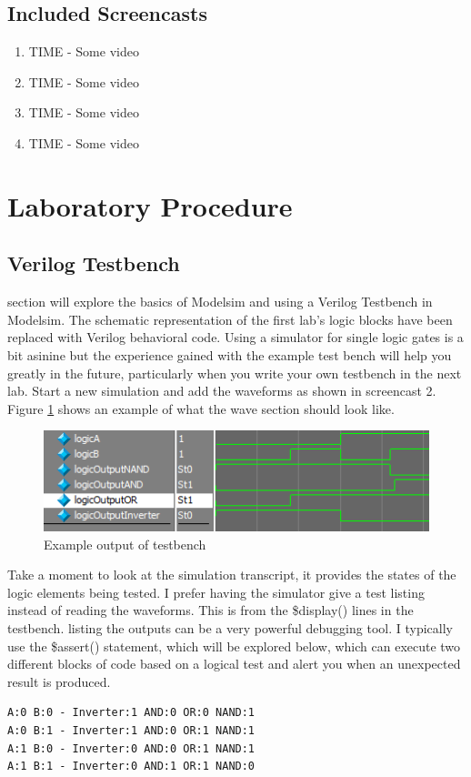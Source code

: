 \documentclass[12pt,journal]{IEEEtran}
\begin{document}
    \subsection{Included Screencasts}
      \begin{enumerate}
        \item TIME - Some video
        \item TIME - Some video
        \item TIME - Some video
        \item TIME - Some video
      \end{enumerate}

  \section{Laboratory Procedure}
  \subsection{Verilog Testbench}
     section will explore the basics of Modelsim and using a Verilog Testbench in Modelsim. The schematic representation of the first lab's logic blocks have been replaced with Verilog behavioral code. Using a simulator for single logic gates is a bit asinine but the experience gained with the example test bench will help you greatly in the future, particularly when you write your own testbench in the next lab. Start a new simulation and add the waveforms as shown in screencast 2. Figure \ref{LogicOut} shows an example of what the wave section should look like. 
    \begin{figure}[H]
      \label{LogicOut}
      \includegraphics[width=.48\textwidth]{Images/LogicOutput.png}
      \caption{Example output of testbench}
    \end{figure}

    Take a moment to look at the simulation transcript, it provides the states of the logic elements being tested.
    I prefer having the simulator give a test listing instead of reading the waveforms. This is from the \$display()
    lines in the testbench. listing the outputs can be a very powerful debugging tool. I typically use the \$assert()
    statement, which will be explored below, which can execute two different blocks of code based on a logical test and alert you when an unexpected result is produced.
    \begin{lstlisting}
A:0 B:0 - Inverter:1 AND:0 OR:0 NAND:1
A:0 B:1 - Inverter:1 AND:0 OR:1 NAND:1
A:1 B:0 - Inverter:0 AND:0 OR:1 NAND:1
A:1 B:1 - Inverter:0 AND:1 OR:1 NAND:0
    \end{lstlisting}
\end{document}
